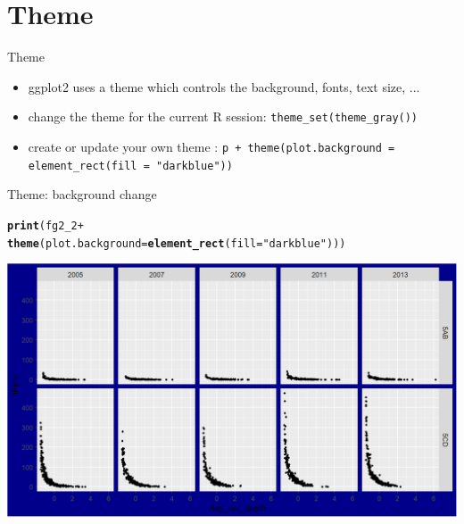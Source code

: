 \documentclass{beamer}\usepackage[]{graphicx}\usepackage[]{color}
\makeatletter
\newcommand{\hlstr}[1]{\textcolor[rgb]{0.192,0.494,0.8}{#1}}%
\newcommand{\hlopt}[1]{\textcolor[rgb]{0,0,0}{#1}}%
\newcommand{\hlstd}[1]{\textcolor[rgb]{0.345,0.345,0.345}{#1}}%
\newcommand{\hlkwc}[1]{\textcolor[rgb]{0.333,0.667,0.333}{#1}}%
\newcommand{\hlkwd}[1]{\textcolor[rgb]{0.737,0.353,0.396}{\textbf{#1}}}%
\newenvironment{kframe}{%
 \def\at@end@of@kframe{}%
 \ifinner\ifhmode%
  \def\at@end@of@kframe{\end{minipage}}%
  \begin{minipage}{\columnwidth}%
 \fi\fi%
 \def\FrameCommand##1{\hskip\@totalleftmargin \hskip-\fboxsep
 \colorbox{shadecolor}{##1}\hskip-\fboxsep
     \hskip-\linewidth \hskip-\@totalleftmargin \hskip\columnwidth}%
 \MakeFramed {\advance\hsize-\width
   \@totalleftmargin\z@ \linewidth\hsize
   \@setminipage}}%
 {\par\unskip\endMakeFramed%
 \at@end@of@kframe}
\newenvironment{knitrout}{}{} %
\makeatother
\begin{document}
\section{Theme}
\begin{frame}{Theme}
\begin{itemize}
\item ggplot2 uses a theme which controls the background, fonts, text size, ...
\item change the theme for the current R session: \lstinline{theme_set(theme_gray())}
\item create or update your own theme : \newline
\lstinline{p + theme(plot.background = element_rect(fill = "darkblue"))}
\end{itemize}
\end{frame}

\begin{frame}[fragile]{Theme: background change}
\begin{knitrout}\footnotesize
{}\color{fgcolor}\begin{kframe}
\begin{alltt}
\hlkwd{print}\hlstd{(fg2_2} \hlopt{+}
        \hlkwd{theme}\hlstd{(}\hlkwc{plot.background} \hlstd{=} \hlkwd{element_rect}\hlstd{(}\hlkwc{fill} \hlstd{=} \hlstr{"darkblue"}\hlstd{)))}
\end{alltt}
\end{kframe}

{\centering \includegraphics[width=.9\linewidth]{figure/theme_1-1} 

}



\end{knitrout}
\end{frame}
\end{document}

